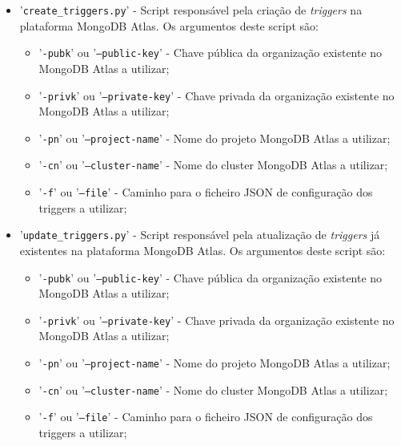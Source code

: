 \begin{itemize}
    \item '\texttt{create\_triggers.py}' - Script responsável pela criação de \textit{triggers} na plataforma MongoDB Atlas. Os argumentos deste script são:
        \begin{itemize}
            \item '\texttt{-pubk}' ou '\texttt{--public-key}' - Chave pública da organização existente no MongoDB Atlas a utilizar;
            \item '\texttt{-privk}' ou '\texttt{--private-key}' - Chave privada da organização existente no MongoDB Atlas a utilizar;
            \item '\texttt{-pn}' ou '\texttt{--project-name}' - Nome do projeto MongoDB Atlas a utilizar;
            \item '\texttt{-cn}' ou '\texttt{--cluster-name}' - Nome do cluster MongoDB Atlas a utilizar;
            \item '\texttt{-f}' ou '\texttt{--file}' - Caminho para o ficheiro JSON de configuração dos triggers a utilizar;
        \end{itemize}
        
    \item '\texttt{update\_triggers.py}' - Script responsável pela atualização de \textit{triggers} já existentes na plataforma MongoDB Atlas. Os argumentos deste script são:
        \begin{itemize}
            \item '\texttt{-pubk}' ou '\texttt{--public-key}' - Chave pública da organização existente no MongoDB Atlas a utilizar;
            \item '\texttt{-privk}' ou '\texttt{--private-key}' - Chave privada da organização existente no MongoDB Atlas a utilizar;
            \item '\texttt{-pn}' ou '\texttt{--project-name}' - Nome do projeto MongoDB Atlas a utilizar;
            \item '\texttt{-cn}' ou '\texttt{--cluster-name}' - Nome do cluster MongoDB Atlas a utilizar;
            \item '\texttt{-f}' ou '\texttt{--file}' - Caminho para o ficheiro JSON de configuração dos triggers a utilizar;
        \end{itemize}
        

\end{itemize}
